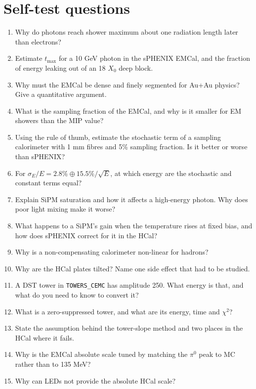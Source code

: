 \documentclass[11pt,letterpaper]{article}
\newcommand{\code}[1]{\texttt{#1}}
\begin{document}
\section{Self-test questions}
\begin{enumerate}
\item Why do photons reach shower maximum about one radiation length later than electrons?
\item Estimate $t_{\max}$ for a 10 GeV photon in the sPHENIX EMCal, and the fraction of energy leaking out of an 18 $X_0$ deep block.
\item Why must the EMCal be dense and finely segmented for Au+Au physics? Give a quantitative argument.
\item What is the sampling fraction of the EMCal, and why is it smaller for EM showers than the MIP value?
\item Using the rule of thumb, estimate the stochastic term of a sampling calorimeter with 1 mm fibres and 5\% sampling fraction. Is it better or worse than sPHENIX?
\item For $\sigma_E/E=2.8\%\oplus15.5\%/\sqrt{E}$, at which energy are the stochastic and constant terms equal?
\item Explain SiPM saturation and how it affects a high-energy photon. Why does poor light mixing make it worse?
\item What happens to a SiPM's gain when the temperature rises at fixed bias, and how does sPHENIX correct for it in the HCal?
\item Why is a non-compensating calorimeter non-linear for hadrons?
\item Why are the HCal plates tilted? Name one side effect that had to be studied.
\item A DST tower in \code{TOWERS\_CEMC} has amplitude 250. What energy is that, and what do you need to know to convert it?
\item What is a zero-suppressed tower, and what are its energy, time and $\chi^2$?
\item State the assumption behind the tower-slope method and two places in the HCal where it fails.
\item Why is the EMCal absolute scale tuned by matching the $\pi^0$ peak to MC rather than to 135 MeV?
\item Why can LEDs not provide the absolute HCal scale?
\end{enumerate}

\appendix
\end{document}
